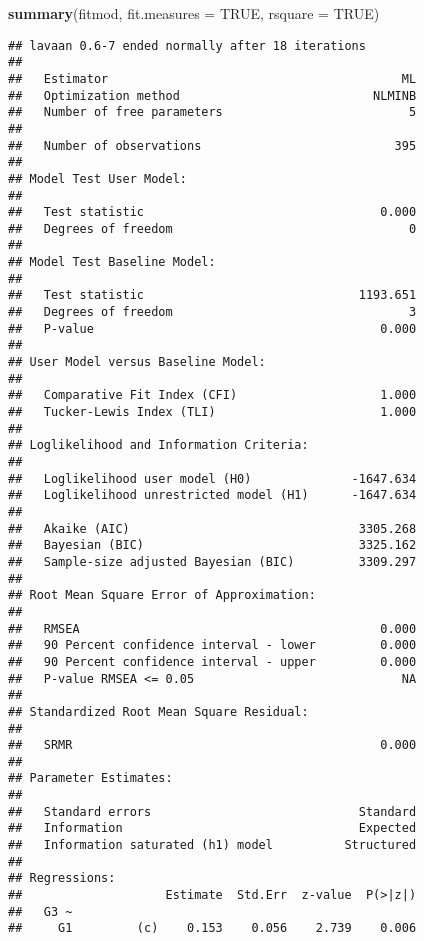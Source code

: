 \documentclass[
]{article}
\newenvironment{Shaded}{\begin{snugshade}}{\end{snugshade}}
\newcommand{\DataTypeTok}[1]{\textcolor[rgb]{0.13,0.29,0.53}{#1}}
\newcommand{\KeywordTok}[1]{\textcolor[rgb]{0.13,0.29,0.53}{\textbf{#1}}}
\newcommand{\NormalTok}[1]{#1}
\newcommand{\OtherTok}[1]{\textcolor[rgb]{0.56,0.35,0.01}{#1}}
\begin{document}
\begin{Shaded}
\begin{Highlighting}[]
\KeywordTok{summary}\NormalTok{(fitmod, }\DataTypeTok{fit.measures =} \OtherTok{TRUE}\NormalTok{, }\DataTypeTok{rsquare =} \OtherTok{TRUE}\NormalTok{)}
\end{Highlighting}
\end{Shaded}

\begin{verbatim}
## lavaan 0.6-7 ended normally after 18 iterations
## 
##   Estimator                                         ML
##   Optimization method                           NLMINB
##   Number of free parameters                          5
##                                                       
##   Number of observations                           395
##                                                       
## Model Test User Model:
##                                                       
##   Test statistic                                 0.000
##   Degrees of freedom                                 0
## 
## Model Test Baseline Model:
## 
##   Test statistic                              1193.651
##   Degrees of freedom                                 3
##   P-value                                        0.000
## 
## User Model versus Baseline Model:
## 
##   Comparative Fit Index (CFI)                    1.000
##   Tucker-Lewis Index (TLI)                       1.000
## 
## Loglikelihood and Information Criteria:
## 
##   Loglikelihood user model (H0)              -1647.634
##   Loglikelihood unrestricted model (H1)      -1647.634
##                                                       
##   Akaike (AIC)                                3305.268
##   Bayesian (BIC)                              3325.162
##   Sample-size adjusted Bayesian (BIC)         3309.297
## 
## Root Mean Square Error of Approximation:
## 
##   RMSEA                                          0.000
##   90 Percent confidence interval - lower         0.000
##   90 Percent confidence interval - upper         0.000
##   P-value RMSEA <= 0.05                             NA
## 
## Standardized Root Mean Square Residual:
## 
##   SRMR                                           0.000
## 
## Parameter Estimates:
## 
##   Standard errors                             Standard
##   Information                                 Expected
##   Information saturated (h1) model          Structured
## 
## Regressions:
##                    Estimate  Std.Err  z-value  P(>|z|)
##   G3 ~                                                
##     G1         (c)    0.153    0.056    2.739    0.006

\end{verbatim}
\end{document}
